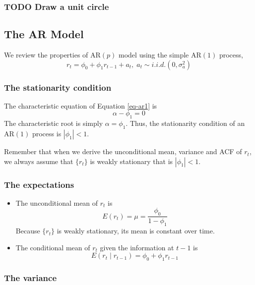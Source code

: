 \documentclass[a4paper,11pt]{article}
\begin{document}
\subsubsection*{{\bfseries\sffamily TODO} Draw a unit circle}
\label{sec:org1932bf8}


\subsection{The AR Model}
\label{sec:orgc461db7}

We review the properties of \(\mathrm{AR}(p)\) model using the simple
\(\mathrm{AR}(1)\) process, 
\begin{equation}
\label{eq-ar1}
r_t = \phi_0 + \phi_1 r_{t-1} + a_t,\; a_t \sim i.i.d.(0, \sigma^2_a)
\end{equation}

\subsubsection*{The stationarity condition}
\label{sec:org9463fb2}

The characteristic equation of Equation \eqref{eq-ar1} is
\[ \alpha - \phi_1 = 0 \]
The characteristic root is simply \(\alpha = \phi_1\). Thus, the
stationarity condition of an \(\mathrm{AR}(1)\) process is
\(|\phi_1|<1\). 

Remember that when we derive the unconditional mean, variance and ACF
of \(r_t\), we always assume that \(\{r_t\}\) is weakly stationary that is
\(|\phi_1| < 1\). 

\subsubsection*{The expectations}
\label{sec:orgd4a20ad}

\begin{itemize}
\item The unconditional mean of \(r_t\) is
\[ E(r_t) = \mu = \frac{\phi_0}{1 - \phi_1} \]
Because \(\{r_t\}\) is weakly stationary, its mean is constant over
time.

\item The conditional mean of \(r_t\) given the information at \(t-1\) is
\[ E(r_t \mid r_{t-1}) = \phi_0 + \phi_1 r_{t-1} \]
\end{itemize}

\subsubsection*{The variance}
\label{sec:orgdc34cfd}
\end{document}
